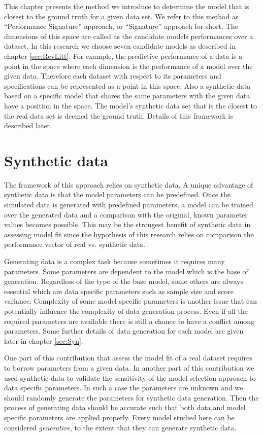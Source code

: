 \label{sec:Approach}

This chapter presents the method we introduce to determine the model that is closest to the ground truth for a given data set.  We refer to this method as ``Performance Signature'' approach, or ``Signature'' approach for short. The dimensions of this space are called as the candidate models performances over a dataset. In this research we choose seven candidate models as described in chapter \ref{sec:RevLitt}. For example, the predictive performance of a data is a point in the space where each dimension is the performance of a model over the given data. Therefore each dataset with respect to its parameters and specifications can be represented as a point in this space. Also a synthetic data based on a specific model that shares the same parameters with the given data have a position in the space.  The model's synthetic data set that is the closest to the real data set is deemed the ground truth.  Details of this framework is described later. 

\section{Synthetic data}
The framework of this approach relies on synthetic data. A unique advantage of synthetic data is that the model parameters can be predefined. Once the simulated data is generated with predefined parameters, a model can be trained over the generated data and a comparison with the original, known parameter values becomes possible. This may be the strongest benefit of synthetic data in assessing model fit since the hypothesis of this research relies on comparison the performance vector of real vs. synthetic data.

Generating data is a complex task because sometimes it requires many parameters. Some parameters are dependent to the model which is the base of generation. Regardless of the type of the base model, some others are always essential which are data specific parameters such as sample size and score variance. Complexity of some model specific parameters is another issue that can potentially influence the complexity of data generation process. Even if all the required parameters are available there is still a chance to have a conflict among parameters. Some further details of data generation for each model are given later in chapter \ref{sec:Syn}. 

One part of this contribution that assess the model fit of a real dataset requires to borrow parameters from a given data. In another part of this contribution we used synthetic data to validate the sensitivity of the model selection approach to data specific parameters. In such a case the parameters are unknown and we should randomly generate the parameters for synthetic data generation. Then the process of generating data should be accurate such that both data  and model specific parameters are applied properly. Every model studied here can be considered \textit{generative}, to the extent that they can generate synthetic data.


